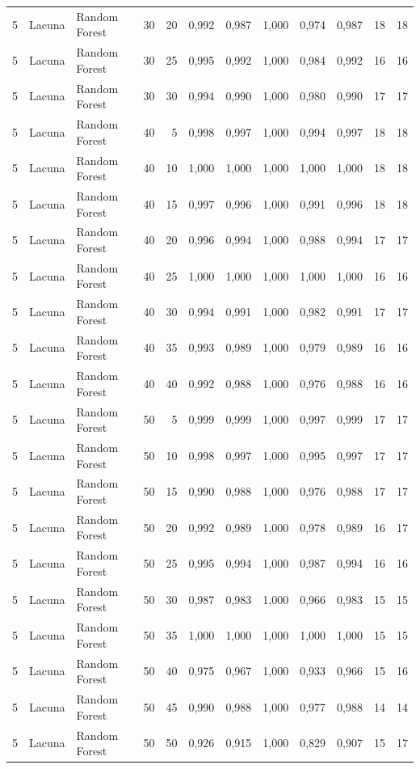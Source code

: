 \begin{longtable}{@{}rllrrrrrrrrr@{}}
5 & Lacuna & Random Forest & 30 & 20 & 0,992 & 0,987 & 1,000 & 0,974 & 0,987 & 18 & 18 \\
5 & Lacuna & Random Forest & 30 & 25 & 0,995 & 0,992 & 1,000 & 0,984 & 0,992 & 16 & 16 \\
5 & Lacuna & Random Forest & 30 & 30 & 0,994 & 0,990 & 1,000 & 0,980 & 0,990 & 17 & 17 \\
5 & Lacuna & Random Forest & 40 & 5 & 0,998 & 0,997 & 1,000 & 0,994 & 0,997 & 18 & 18 \\
5 & Lacuna & Random Forest & 40 & 10 & 1,000 & 1,000 & 1,000 & 1,000 & 1,000 & 18 & 18 \\
5 & Lacuna & Random Forest & 40 & 15 & 0,997 & 0,996 & 1,000 & 0,991 & 0,996 & 18 & 18 \\
5 & Lacuna & Random Forest & 40 & 20 & 0,996 & 0,994 & 1,000 & 0,988 & 0,994 & 17 & 17 \\
5 & Lacuna & Random Forest & 40 & 25 & 1,000 & 1,000 & 1,000 & 1,000 & 1,000 & 16 & 16 \\
5 & Lacuna & Random Forest & 40 & 30 & 0,994 & 0,991 & 1,000 & 0,982 & 0,991 & 17 & 17 \\
5 & Lacuna & Random Forest & 40 & 35 & 0,993 & 0,989 & 1,000 & 0,979 & 0,989 & 16 & 16 \\
5 & Lacuna & Random Forest & 40 & 40 & 0,992 & 0,988 & 1,000 & 0,976 & 0,988 & 16 & 16 \\
5 & Lacuna & Random Forest & 50 & 5 & 0,999 & 0,999 & 1,000 & 0,997 & 0,999 & 17 & 17 \\
5 & Lacuna & Random Forest & 50 & 10 & 0,998 & 0,997 & 1,000 & 0,995 & 0,997 & 17 & 17 \\
5 & Lacuna & Random Forest & 50 & 15 & 0,990 & 0,988 & 1,000 & 0,976 & 0,988 & 17 & 17 \\
5 & Lacuna & Random Forest & 50 & 20 & 0,992 & 0,989 & 1,000 & 0,978 & 0,989 & 16 & 17 \\
5 & Lacuna & Random Forest & 50 & 25 & 0,995 & 0,994 & 1,000 & 0,987 & 0,994 & 16 & 16 \\
5 & Lacuna & Random Forest & 50 & 30 & 0,987 & 0,983 & 1,000 & 0,966 & 0,983 & 15 & 15 \\
5 & Lacuna & Random Forest & 50 & 35 & 1,000 & 1,000 & 1,000 & 1,000 & 1,000 & 15 & 15 \\
5 & Lacuna & Random Forest & 50 & 40 & 0,975 & 0,967 & 1,000 & 0,933 & 0,966 & 15 & 16 \\
5 & Lacuna & Random Forest & 50 & 45 & 0,990 & 0,988 & 1,000 & 0,977 & 0,988 & 14 & 14 \\
5 & Lacuna & Random Forest & 50 & 50 & 0,926 & 0,915 & 1,000 & 0,829 & 0,907 & 15 & 17 \\

\end{longtable}
